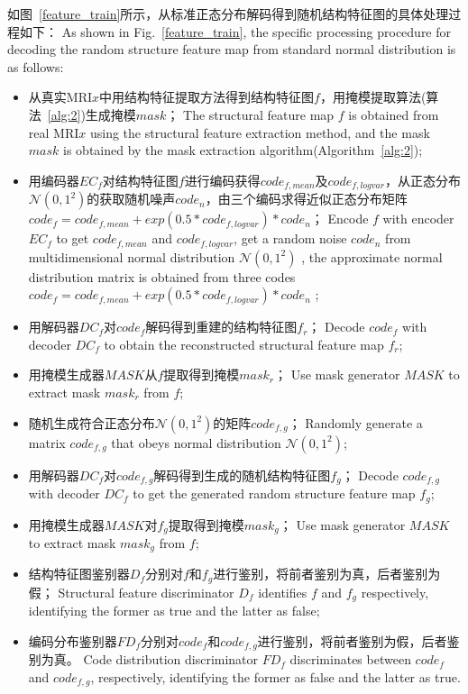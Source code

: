 \documentclass[letterpaper]{article} %
\begin{document}
如图~\ref{feature_train}所示，从标准正态分布解码得到随机结构特征图的具体处理过程如下：
As shown in Fig.~\ref{feature_train}, the specific processing procedure for decoding the random structure feature map from standard normal distribution is as follows:
\begin{itemize}
	\item 从真实MRI$x$中用结构特征提取方法得到结构特征图$f$，用掩模提取算法(算法~\ref{alg:2})生成掩模$mask$；
	The structural feature map $f$ is obtained from real MRI$x$ using the structural feature extraction method, and the mask $mask$ is obtained by the mask extraction algorithm(Algorithm~\ref{alg:2});
	\item 用编码器$EC_f$对结构特征图$f$进行编码获得$code_{f,mean}$及$code_{f,logvar}$，从正态分布$\mathcal{N}(0,1^2)$的获取随机噪声$code_n$，由三个编码求得近似正态分布矩阵$code_f=code_{f,mean}+exp(0.5*code_{f,logvar})*code_n$；
	Encode $f$ with encoder $EC_f$ to get $code_{f,mean}$ and $code_{f,logvar}$, get a random noise $code_n$ from multidimensional normal distribution $\mathcal{N}(0,1^2)$ , the approximate normal distribution matrix is obtained from three codes $code_f=code_{f,mean}+exp(0.5*code_{f,logvar})*code_n$ ;
	\item 用解码器$DC_f$对$code_f$解码得到重建的结构特征图$f_r$；
	Decode $code_f$ with decoder $DC_f$ to obtain the reconstructed structural feature map $f_r$;
	\item 用掩模生成器$MASK$从$f$提取得到掩模$mask_r$；
	Use mask generator $MASK$ to extract mask $mask_r$ from $f$;
	\item 随机生成符合正态分布$\mathcal{N}(0,1^2)$的矩阵$code_{f,g}$；
	Randomly generate a matrix $code_{f,g}$ that obeys normal distribution $\mathcal{N}(0,1^2)$;
	\item 用解码器$DC_f$对$code_{f,g}$解码得到生成的随机结构特征图$f_g$；
	Decode $code_{f,g}$ with decoder $DC_f$ to get the generated random structure feature map $f_g$;
	\item 用掩模生成器$MASK$对$f_g$提取得到掩模$mask_g$；
	Use mask generator $MASK$ to extract mask $mask_g$ from $f$;
	\item 结构特征图鉴别器$D_f$分别对$f$和$f_g$进行鉴别，将前者鉴别为真，后者鉴别为假；
	Structural feature discriminator $D_f$ identifies $f$ and $f_g$ respectively, identifying the former as true and the latter as false;
	\item 编码分布鉴别器$FD_f$分别对$code_f$和$code_{f,g}$进行鉴别，将前者鉴别为假，后者鉴别为真。
	Code distribution discriminator $FD_f$ discriminates between $code_f$ and $code_{f,g}$, respectively, identifying the former as false and the latter as true.
\end{itemize}
\end{document}
